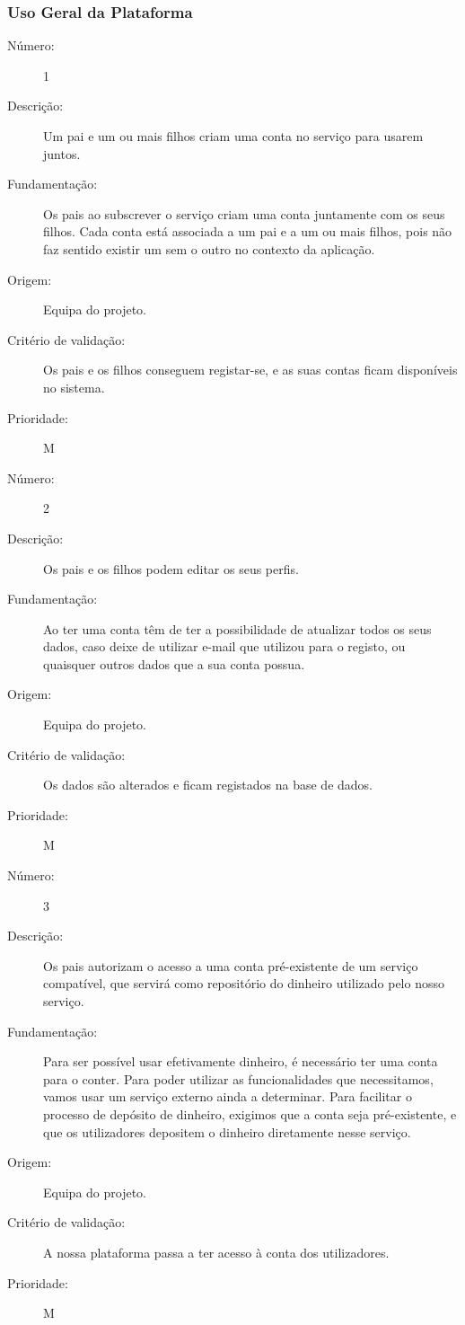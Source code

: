 \documentclass{article}
\begin{document}
    \subsubsection{Uso Geral da Plataforma}

      \begin{description}
        \item[Número:]1
        \item[Descrição:] Um pai e um ou mais filhos criam uma conta no serviço para usarem juntos.
        \item[Fundamentação:] Os pais ao subscrever o serviço criam uma conta juntamente com os seus filhos. Cada conta está associada a um pai e a um ou mais filhos, pois não faz sentido existir um sem o outro no contexto da aplicação.
        \item[Origem:]Equipa do projeto.
        \item[Critério de validação:]Os pais e os filhos conseguem registar-se, e as suas contas ficam disponíveis no sistema.
        \item[Prioridade:]M
      \end{description}
      \vspace{0.5cm}
      \begin{description}
        \item[Número:]2
        \item[Descrição:] Os pais e os filhos podem editar os seus perfis.
        \item[Fundamentação:]Ao ter uma conta têm de ter a possibilidade de atualizar todos os seus dados, caso deixe de utilizar e-mail que utilizou para o registo, ou quaisquer outros dados que a sua conta possua.
        \item[Origem:]Equipa do projeto.
        \item[Critério de validação:]Os dados são alterados e ficam registados na base de dados.
        \item[Prioridade:]M
      \end{description}
      \vspace{0.5cm}
      \begin{description}
        \item[Número:]3
        \item[Descrição:]Os pais autorizam o acesso a uma conta pré-existente de um serviço compatível, que servirá como repositório do dinheiro utilizado pelo nosso serviço.
        \item[Fundamentação:] Para ser possível usar efetivamente dinheiro, é necessário ter uma conta para o conter. Para poder utilizar as funcionalidades que necessitamos, vamos usar um serviço externo ainda a determinar. Para facilitar o processo de depósito de dinheiro, exigimos que a conta seja pré-existente, e que os utilizadores depositem o dinheiro diretamente nesse serviço. 
        \item[Origem:] Equipa do projeto.
        \item[Critério de validação:]A nossa plataforma passa a ter acesso à conta dos utilizadores.
        \item[Prioridade:]M
      \end{description}
\end{document}
